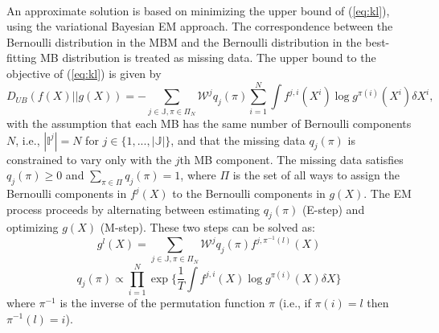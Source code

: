 ~\\
An approximate solution is based on minimizing the upper bound of (\ref{eq:kl}), using the variational Bayesian EM approach. The correspondence between the Bernoulli distribution in the MBM and the Bernoulli distribution in the best-fitting MB distribution is treated as missing data. The upper bound to the objective of (\ref{eq:kl}) is given by \cite{variational}
\begin{equation}
D_{UB}(f(X)||g(X))= -\sum_{j\in\mathbb{J},\pi\in\Pi_N}\mathcal{W}^jq_j(\pi)\sum_{i=1}^N\int f^{j,i}(X^i)\log g^{\pi(i)}(X^i)\delta X^i,
\label{eq:vaorigin}
\end{equation}
with the assumption that each MB has the same number of Bernoulli components  $N$, i.e., $|\mathbb{I}^j|=N$ for $j\in\{1,...,|\mathbb{J}|\}$, and that the missing data $q_j(\pi)$ is constrained to vary only with the $j$th MB component. The missing data satisfies $q_j(\pi) \geq 0$ and $\sum_{\pi\in\Pi}q_j(\pi)=1$, where $\Pi$ is the set of all ways to assign the Bernoulli components in $f^j(X)$ to the Bernoulli components in $g(X)$. The EM process proceeds by alternating between estimating $q_j(\pi)$ (E-step) and optimizing $g(X)$ (M-step). These two steps can be solved as:
\begin{equation}
    g^{l}(X) = \sum_{j\in\mathbb{J},\pi\in\Pi_N}\mathcal{W}^jq_j(\pi)f^{j,\pi^{-1}(l)}(X)
    \label{eq:mstep}
\end{equation}
\begin{equation}
    q_j(\pi)\propto \prod^N_{i=1}\exp\bigg\{\frac{
    1}{T}\int f^{j,i}(X)\log g^{\pi(i)}(X)\delta X\bigg\}
    \label{eq:estep}
\end{equation}
where $\pi^{-1}$ is the inverse of the permutation function $\pi$ (i.e., if $\pi(i)=l$ then $\pi^{-1}(l)=i$).

